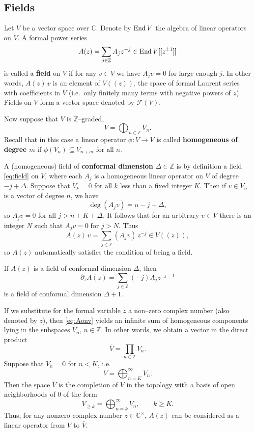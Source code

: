 \documentclass[12pt]{article}
\begin{document}
\subsection{Fields}
Let $V$ be a vector space over $\mathbb{C}$. Denote by $\operatorname{End} V$ the algebra of linear operators on $V$.  
A formal power series
\begin{equation}\label{eq:field}
A(z) = \sum_{j \in \mathbb{Z}} A_j z^{-j} \in \operatorname{End} V[[z^{\pm1}]]
\end{equation}
is called a \textbf{field} on $V$ if for any $v \in V$ we have $A_j v = 0$ for large enough $j$.  
In other words, $A(z)\,v$ is an element of $V((z))$, the space of formal Laurent series with coefficients in $V$ (i.e.\ only finitely many terms with negative powers of $z$).  
Fields on $V$ form a vector space denoted by $\mathcal{F}(V)$.

Now suppose that $V$ is $\mathbb{Z}$–graded,
\[
V = \bigoplus_{n \in \mathbb{Z}} V_n.
\]
Recall that in this case a linear operator $\phi : V \to V$ is called \textbf{homogeneous of degree $m$} if $\phi(V_n) \subseteq V_{n+m}$ for all $n$.

A (homogeneous) field of \textbf{conformal dimension} $\Delta \in \mathbb{Z}$ is by definition a field \eqref{eq:field} on $V$, where each $A_j$ is a homogeneous linear operator on $V$ of degree $-j + \Delta$.
Suppose that $V_k = 0$ for all $k$ less than a fixed integer $K$.  
Then if $v \in V_n$ is a vector of degree $n$, we have
\[
\deg(A_j v) = n - j + \Delta,
\]
so $A_j v = 0$ for all $j > n + K + \Delta$.  
It follows that for an arbitrary $v \in V$ there is an integer $N$ such that $A_j v = 0$ for $j > N$. Thus
\begin{equation}\label{eq:Aonv}
A(z)\,v = \sum_{j \in \mathbb{Z}} (A_j v)\, z^{-j} \in V((z)),
\end{equation}
so $A(z)$ automatically satisfies the condition of being a field.

\medskip

If $A(z)$ is a field of conformal dimension $\Delta$, then
\[
\partial_z A(z) = \sum_{j \in \mathbb{Z}} (-j) A_j z^{-j-1}
\]
is a field of conformal dimension $\Delta + 1$.

\medskip

If we substitute for the formal variable $z$ a non–zero complex number (also denoted by $z$), then \eqref{eq:Aonv} yields an infinite sum of homogeneous components lying in the subspaces $V_n$, $n \in \mathbb{Z}$.  
In other words, we obtain a vector in the direct product
\[
\overline{V} = \prod_{n \in \mathbb{Z}} V_n.
\]
Suppose that $V_n = 0$ for $n < K$, i.e.
\[
V = \bigoplus_{n=K}^{\infty} V_n.
\]
Then the space $\overline{V}$ is the completion of $V$ in the topology with a basis of open neighborhoods of $0$ of the form
\[
V_{\ge k} = \bigoplus_{n=k}^{\infty} V_n, \qquad k \ge K.
\]
Thus, for any nonzero complex number $z \in \mathbb{C}^\times$, $A(z)$ can be considered as a linear operator from $V$ to $\overline{V}$.
\end{document}
